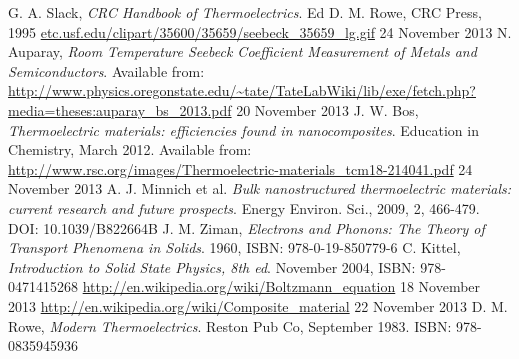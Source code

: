 \documentclass[a4paper,10pt,journal]{IEEEtran}
\begin{document}

\begin{thebibliography}{2}
G. A. Slack, \emph{CRC Handbook of Thermoelectrics}. Ed D. M. Rowe, CRC Press, 1995
\url{etc.usf.edu/clipart/35600/35659/seebeck_35659_lg.gif} 24 November
2013
N. Auparay, \emph{Room Temperature Seebeck Coefficient Measurement
of Metals and Semiconductors}. Available
from:
\url{http://www.physics.oregonstate.edu/~tate/TateLabWiki/lib/exe/fetch.php?media=theses:auparay_bs_2013.pdf} 20 November 2013
J. W. Bos, \emph{Thermoelectric materials: efficiencies found in
nanocomposites}. Education in Chemistry, March 2012. Available
from:
\url{http://www.rsc.org/images/Thermoelectric-materials_tcm18-214041.pdf} 24 November 2013
A. J. Minnich et al. \emph{Bulk nanostructured thermoelectric
materials: current research and future prospects}. Energy Environ.
Sci., 2009, 2, 466-479. DOI: 10.1039/B822664B
J. M. Ziman, \emph{Electrons and Phonons: The Theory of Transport
Phenomena in Solids}. 1960, ISBN: 978-0-19-850779-6
C. Kittel, \emph{Introduction to Solid State Physics, 8th ed}. November 2004, ISBN: 978-0471415268
\url{http://en.wikipedia.org/wiki/Boltzmann_equation} 18 November 2013
\url{http://en.wikipedia.org/wiki/Composite_material} 22 November 2013
D. M. Rowe, \emph{Modern Thermoelectrics}. Reston Pub Co, September
1983. ISBN: 978-0835945936
\end{thebibliography}
\end{document}
